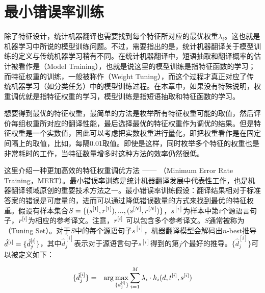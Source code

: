 
\sectionnewpage
\section{最小错误率训练}\label{section-7.6}

\parinterval 除了特征设计，统计机器翻译也需要找到每个特征所对应的最优权重$\lambda_i$。这也就是机器学习中所说的模型训练问题。不过，需要指出的是，统计机器翻译关于模型训练的定义与传统机器学习稍有不同。在统计机器翻译中，短语抽取和翻译概率的估计被看作是{\small{}}（Model Training），也就是说这里的模型训练是指特征函数的学习；而特征权重的训练，一般被称作{\small{}}（Weight Tuning），而这个过程才真正对应了传统机器学习（如分类任务）中的模型训练过程。在本章中，如果没有特殊说明，权重调优就是指特征权重的学习，模型训练是指短语抽取和特征函数的学习。

\parinterval 想要得到最优的特征权重，最简单的方法是枚举所有特征权重可能的取值，然后评价每组权重所对应的翻译性能，最后选择最优的特征权重作为调优的结果。但是特征权重是一个实数值，因此可以考虑把实数权重进行量化，即把权重看作是在固定间隔上的取值，比如，每隔0.01取值。即使是这样，同时枚举多个特征的权重也是非常耗时的工作，当特征数量增多时这种方法的效率仍然很低。

\parinterval 这里介绍一种更加高效的特征权重调优方法$\ \dash \ ${\small{}}（Minimum Error Rate Training，MERT）。最小错误率训练是统计机器翻译发展中代表性工作，也是机器翻译领域原创的重要技术方法之一。最小错误率训练假设：翻译结果相对于标准答案的错误是可度量的，进而可以通过降低错误数量的方式来找到最优的特征权重。假设有样本集合$S = \{(s^{[1]},{r}^{[1]}),...,(s^{[N]},{r}^{[N]})\}$，$s^{[i]}$为样本中第$i$个源语言句子，${r}^{[i]}$为相应的参考译文。注意，${r}^{[i]}$ 可以包含多个参考译文。$S$通常被称为{\small{}}（Tuning Set）。对于$S$中的每个源语句子$s^{[i]}$，机器翻译模型会解码出$n$-best推导$\hat{{d}}^{[i]} = \{\hat{d}_{j}^{[i]}\}$，其中$\hat{d}_{j}^{[i]}$表示对于源语言句子$s^{[i]}$得到的第$j$个最好的推导。$\{\hat{d}_{j}^{[i]}\}$可以被定义如下：

\begin{eqnarray}
\{\hat{d}_{j}^{[i]}\} & = & \arg\max_{\{d_{j}^{[i]}\}} \sum_{i=1}^{M} \lambda_i \cdot h_i (d,{t}^{[i]},{s}^{[i]})
\label{eq:7-17}
\end{eqnarray}

